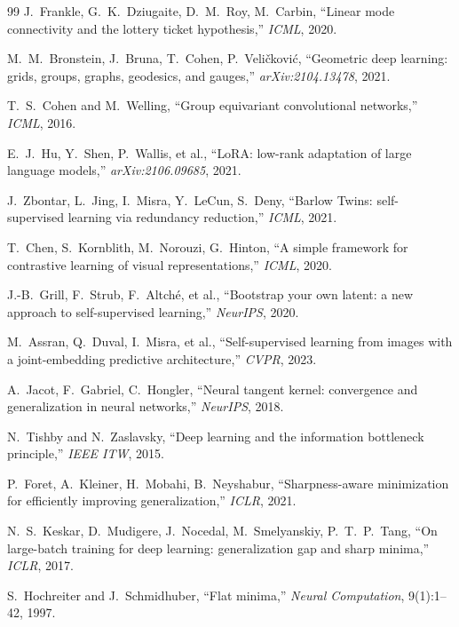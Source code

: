 \documentclass[11pt, a4paper]{article}
\theoremstyle{plain}
\theoremstyle{definition}
\theoremstyle{remark}
\begin{document}
\begin{thebibliography}{99}
J.~Frankle, G.~K.~Dziugaite, D.~M.~Roy, M.~Carbin, ``Linear mode connectivity and the lottery ticket hypothesis,'' \emph{ICML}, 2020.

M.~M.~Bronstein, J.~Bruna, T.~Cohen, P.~Veli\v{c}kovi\'{c}, ``Geometric deep learning: grids, groups, graphs, geodesics, and gauges,'' \emph{arXiv:2104.13478}, 2021.

T.~S.~Cohen and M.~Welling, ``Group equivariant convolutional networks,'' \emph{ICML}, 2016.

E.~J.~Hu, Y.~Shen, P.~Wallis, et al., ``LoRA: low-rank adaptation of large language models,'' \emph{arXiv:2106.09685}, 2021.

J.~Zbontar, L.~Jing, I.~Misra, Y.~LeCun, S.~Deny, ``Barlow Twins: self-supervised learning via redundancy reduction,'' \emph{ICML}, 2021.

T.~Chen, S.~Kornblith, M.~Norouzi, G.~Hinton, ``A simple framework for contrastive learning of visual representations,'' \emph{ICML}, 2020.

J.-B.~Grill, F.~Strub, F.~Altch\'{e}, et al., ``Bootstrap your own latent: a new approach to self-supervised learning,'' \emph{NeurIPS}, 2020.

M.~Assran, Q.~Duval, I.~Misra, et al., ``Self-supervised learning from images with a joint-embedding predictive architecture,'' \emph{CVPR}, 2023.

A.~Jacot, F.~Gabriel, C.~Hongler, ``Neural tangent kernel: convergence and generalization in neural networks,'' \emph{NeurIPS}, 2018.

N.~Tishby and N.~Zaslavsky, ``Deep learning and the information bottleneck principle,'' \emph{IEEE ITW}, 2015.

P.~Foret, A.~Kleiner, H.~Mobahi, B.~Neyshabur, ``Sharpness-aware minimization for efficiently improving generalization,'' \emph{ICLR}, 2021.

N.~S.~Keskar, D.~Mudigere, J.~Nocedal, M.~Smelyanskiy, P.~T.~P.~Tang, ``On large-batch training for deep learning: generalization gap and sharp minima,'' \emph{ICLR}, 2017.

S.~Hochreiter and J.~Schmidhuber, ``Flat minima,'' \emph{Neural Computation}, 9(1):1--42, 1997.


\end{thebibliography}
\end{document}
